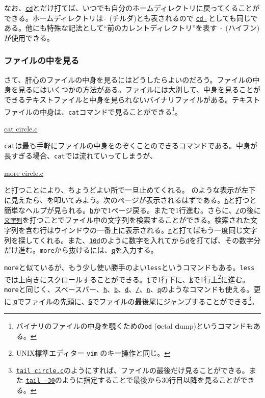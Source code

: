 なお、\underline{\texttt{cd}}とだけ打てば、いつでも自分のホームディレクトリに戻ってくることができる。ホームディレクトリは \(\tilde{\ }\) (チルダ)とも表されるので \underline{\texttt{cd \(\tilde{\ }\)}}としても同じである。他にも特殊な記法として``前のカレントディレクトリ''を表す \texttt{-} (ハイフン)が使用できる。

\subsubsection*{ファイルの中を見る}

さて、肝心のファイルの中身を見るにはどうしたらよいのだろう。ファイルの中身を見るにはいくつかの方法がある。ファイルには大別して、中身を見ることができるテキストファイルと中身を見られないバイナリファイルがある。テキストファイルの中身は、\texttt{cat}コマンドで見ることができる\footnote{バイナリのファイルの中身を覗くための\texttt{od} (\textbf{o}ctal \textbf{d}ump)というコマンドもある。}。
\begin{commandline2}
    \prompt \underline{cat circle.c}
\end{commandline2} \noindent
\texttt{cat}は最も手軽にファイルの中身をのぞくことのできるコマンドである。中身が長すぎる場合、\texttt{cat}では流れていってしまうが、
\begin{commandline2}
    \prompt \underline{more circle.c}
\end{commandline2} \noindent
と打つことにより、ちょうどよい所で一旦止めてくれる。 のような表示が左下に見えたら、\spc を叩いてみよう。次のページが表示されるはずである。\underline{\texttt{h}}と打つと簡単なヘルプが見られる。\underline{\texttt{b}}かで1ページ戻る。また\ret で1行進む。さらに、\underline{\texttt{/}}の後に\underline{\texttt{文字列}}を打つことでファイル中の文字列を検索することができる。検索された文字列を含む行はウインドウの一番上に表示される。\underline{\texttt{n}}と打てばもう一度同じ文字列を探してくれる。また、\underline{\texttt{10d}}のように数字を入れてから\underline{\texttt{d}}を打てば、その数字分だけ進む。\texttt{more}から抜けるには、\underline{\texttt{q}}を入力する。

\texttt{more}と似ているが、もう少し使い勝手のよい\texttt{less}\label{sect:less}というコマンドもある。\texttt{less}では上向きにスクロールすることができる。\underline{\texttt{j}}で1行下に、\underline{\texttt{k}}で1行上\footnote{UNIX標準エディター \texttt{vim} のキー操作と同じ。}に進む。\texttt{more}と同じく、スペースバー、\underline{\texttt{h}}、\underline{\texttt{b}}、\underline{\texttt{d}}、\underline{\texttt{/}}、\underline{\texttt{n}}、\underline{\texttt{q}}のようなコマンドも使える。更に \underline{\texttt{g}}でファイルの先頭に、\underline{\texttt{G}}でファイルの最後尾にジャンプすることができる\footnote{\texttt{\underline{tail circle.c}}のようにすれば、ファイルの最後だけ見ることができる。また \underline{\texttt{tail -30}}のように指定することで最後から30行目以降を見ることができる。}。

